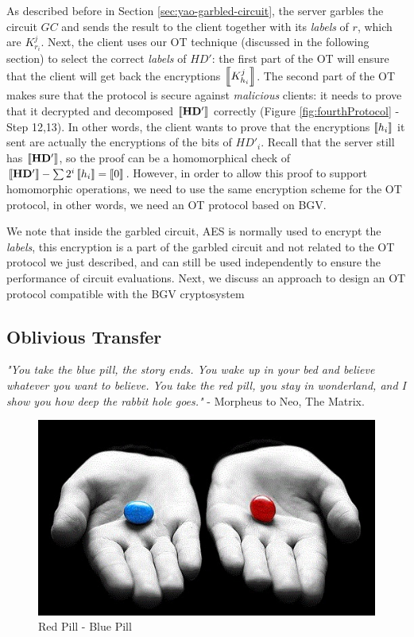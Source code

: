 As described before in Section \ref{sec:yao-garbled-circuit}, the server garbles
the circuit \(GC\) and sends the result to the client together with its
\textit{labels} of \(r\), which are \(K_{r_{i}}^{j}\). Next, the client uses our
OT technique (discussed in the following section) to select the correct
\textit{labels} of \(HD'\): the first part of the OT will ensure that the client
will get back the encryptions \(\left\llbracket K_{h_{i}}^{j}\right\rrbracket\). The second part of the OT
makes sure that the protocol is secure against \textit{malicious} clients: it
needs to prove that it decrypted and decomposed \(\left\llbracket\mathbf{HD'}\right\rrbracket\) correctly
(Figure \ref{fig:fourthProtocol} - Step 12,13). In other words, the client wants
to prove that the encryptions \(\left\llbracket h_{i}\right\rrbracket\) it sent are actually the
encryptions of the bits of \(HD'_{i}\). Recall that the server still has
\(\left\llbracket\mathbf{HD'}\right\rrbracket\), so the proof can be a homomorphical check of
\(\left\llbracket\mathbf{HD'}\right\rrbracket - \sum{2^{i}\left\llbracket h_{i}\right\rrbracket} = \left\llbracket0\right\rrbracket\). However,
in order to allow this proof to support homomorphic operations, we need to use
the same encryption scheme for the OT protocol, in other words, we need an OT
protocol based on BGV.

We note that inside the garbled circuit, AES is normally used to encrypt the
\textit{labels}, this encryption is a part of the garbled circuit and not
related to the OT protocol we just described, and can still be used independently
to ensure the performance of circuit evaluations. Next, we discuss an approach
to design an OT protocol compatible with the BGV cryptosystem

\subsection{Oblivious Transfer}
\label{sec:obliviousTransferPre}

\textit{"You take the blue pill, the story ends. You wake up in your bed and
  believe whatever you want to believe. You take the red pill, you stay in
  wonderland, and I show you how deep the rabbit hole goes."} - Morpheus to Neo,
The Matrix.


\begin{figure}[htbp!] 
\centering    
\includegraphics[width=1.0\textwidth]{Chapter2/Figs/Raster/RedPillBluePill}
\caption[Minion]{Red Pill - Blue Pill}
\label{fig:RedPillBluePill}
\end{figure}

